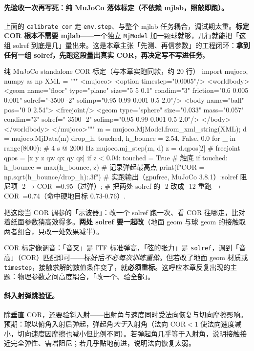 \paragraph{先验收一次再写死：纯 MuJoCo 落体标定（不依赖 mjlab，照敲即跑）。}上面的 \verb|calibrate_cor| 走 \verb|env.step|、与整个 mjlab 任务耦合，调试期太重。\textbf{标定 COR 根本不需要 mjlab}——一个独立 \verb|MjModel| 加一颗球就够，几行就能把「这组 solref 到底是几」量出来。这是本章主张「先测、再信参数」的工程闭环：\textbf{拿到任何一组 solref，先跑这段量出真实 COR，再决定写不写进任务}。

\begin{codebox}[Python]{纯 MuJoCo standalone COR 标定（与本章实跑同款，约 20 行）}
import mujoco, numpy as np
XML = """
<mujoco>
  <option timestep="0.0005"/>
  <worldbody>
    <geom name="floor" type="plane" size="5 5 0.1" condim="3"
          friction="0.6 0.005 0.001" solref="-3500 -2" solimp="0.95 0.99 0.001 0.5 2.0"/>
    <body name="ball" pos="0 0 2.54">
      <freejoint/>
      <geom type="sphere" size="0.033" mass="0.057" condim="3"
            solref="-3500 -2" solimp="0.95 0.99 0.001 0.5 2.0"/>
    </body>
  </worldbody>
</mujoco>"""
m = mujoco.MjModel.from_xml_string(XML); d = mujoco.MjData(m)
drop_h, touched, h_bounce = 2.54, False, 0.0
for _ in range(8000):                       # 4 s @ 2000 Hz
    mujoco.mj_step(m, d)
    z = d.qpos[2]                            # freejoint qpos = [x y z qw qx qy qz]
    if z < 0.04: touched = True              # 触底
    if touched: h_bounce = max(h_bounce, z)  # 记录弹起最高点
print(f"COR = {np.sqrt(h_bounce/drop_h):.3f}")
# 实跑输出（gpufree, MuJoCo 3.8.1）:solref 阻尼项 -2 → COR~=0.95（过弹）;
#   把两处 solref 的 -2 改成 -12 重跑 → COR~=0.74（命中硬地目标 0.73-0.76）.
\end{codebox}

把这段当 COR 调参的「示波器」：改一个 solref 跑一次、看 COR 往哪走，比对着纸面参数猜高效得多。\textbf{两处 solref 要一起改}（地面 geom 与球 geom 的接触取两者组合，只改一处效果减半）。

\begin{insight}\label{ins:rlmc-tennis-cor}
COR 标定像调音：「音叉」是 ITF 标准弹高，「弦的张力」是 \verb|solref|，调到「音高」（COR）匹配即可——标好后\emph{不必每次训练重做}。但若改了地面 geom 材质或 \verb|timestep|，接触求解的数值条件变了，就\textbf{必须重标}。这呼应本章反复出现的主题：物理参数之间高度耦合，「改一个、验全部」。
\end{insight}

\paragraph{斜入射弹跳验证。}除垂直 COR，还要验斜入射——出射角与速度同时受法向恢复与切向摩擦影响。预期：球以俯角入射后弹起，弹起角\emph{大于}入射角（法向 COR$<1$ 使法向速度减小，切向速度因摩擦也减小但比例不同）。若弹起角几乎等于入射角，说明接触接近完全弹性、需增阻尼；若几乎贴地前进，说明法向恢复太弱。

